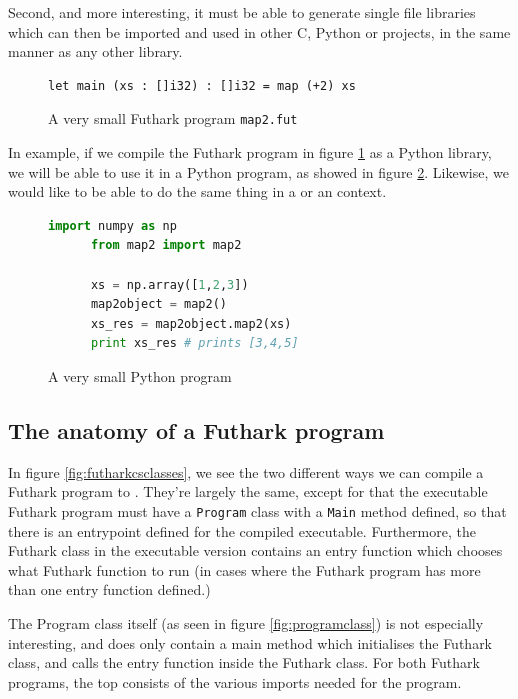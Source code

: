 Second, and more interesting, it must be able to generate single file libraries
which can then be imported and used in other C, Python or \csharp{} projects, in
the same manner as any other library.

\begin{figure}[h]
  \centering
    \begin{lstlisting}[language=Futhark]
      let main (xs : []i32) : []i32 = map (+2) xs
    \end{lstlisting}
  \caption{A very small Futhark program \texttt{map2.fut}}
  \label{fig:smallfut}
\end{figure}
In example, if we compile the Futhark program in figure \ref{fig:smallfut} as a
Python library, we will be able to use it in a Python program, as showed in figure \ref{fig:smallpython}.
Likewise, we would like to be able to do the same thing in a \csharp{} or an
\fsharp{} context.
\begin{figure}[h]
  \centering
    \begin{lstlisting}[language=python]
      import numpy as np
      from map2 import map2

      xs = np.array([1,2,3])
      map2object = map2()
      xs_res = map2object.map2(xs)
      print xs_res # prints [3,4,5]
    \end{lstlisting}
  \caption{A very small Python program}
  \label{fig:smallpython}
\end{figure}

\subsection*{The anatomy of a Futhark \csharp{} program}
In figure \ref{fig:futharkcsclasses}, we see the two different ways we can
compile a Futhark program to \csharp{}. They're largely the same, except for
that the executable Futhark program must have a \texttt{Program} class with a
\texttt{Main} method defined, so that there is an entrypoint defined for the
compiled executable. Furthermore, the Futhark class in the executable version
contains an entry function which chooses what Futhark function to run (in cases
where the Futhark program has more than one entry function defined.) 

The Program class itself (as seen in figure \ref{fig:programclass}) is not especially
interesting, and does only contain a main method which initialises the Futhark
class, and calls the entry function inside the Futhark class.
For both Futhark programs, the top consists of the various imports needed for
the program.

